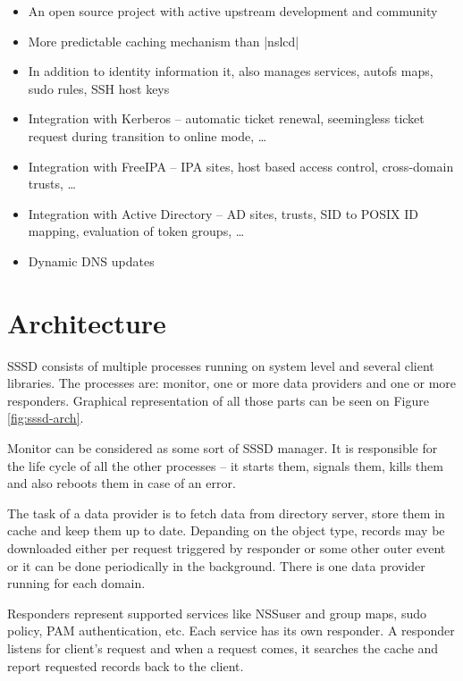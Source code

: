 \begin{itemize}
  \item An open source project with active upstream development and community
  \item More predictable caching mechanism than |nslcd|
  \item In addition to identity information it, also manages services, autofs
        maps, sudo rules, SSH host keys
  \item Integration with Kerberos -- automatic ticket renewal, seemingless
        ticket request during transition to online mode, \ldots
  \item Integration with FreeIPA -- IPA sites, host based access control,
        cross-domain trusts, \ldots
  \item Integration with Active Directory -- AD sites, trusts, SID to POSIX ID
        mapping, evaluation of token groups, \ldots
  \item Dynamic DNS updates 
\end{itemize}

\section{Architecture}
\label{sssd:arch}

SSSD consists of multiple processes running on system level and several client
libraries. The processes are: monitor, one or more data providers and one or
more responders. Graphical representation of all those parts can be seen on
Figure \ref{fig:sssd-arch}.

Monitor can be considered as some sort of SSSD manager. It is responsible for
the life cycle of all the other processes -- it starts them, signals them,
kills them and also reboots them in case of an error.

The task of a data provider is to fetch data from directory server, store them
in cache and keep them up to date. Depanding on the object type, records may
be downloaded either per request triggered by responder or some other outer
event or it can be done periodically in the background. There is one data
provider running for each domain.

Responders represent supported services like NSS\footnotemark user and
group maps, sudo policy, PAM authentication, etc. Each service has its own
responder. A responder listens for client's request and when a request comes,
it searches the cache and report requested records back to the client.

